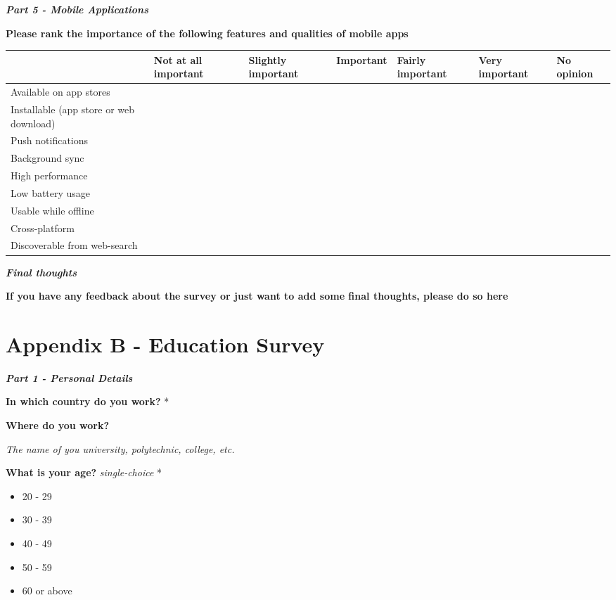 \documentclass[a4paper,12pt]{article}
\begin{document}
\textbf{\textit{Part 5 - Mobile Applications}}

\textbf{Please rank the importance of the following features and qualities of mobile apps}
\begin{tabular}{|p{3cm}|p{1.7cm}|p{1.7cm}|p{1.6cm}|p{1.7cm}|p{1.6cm}|p{1.4cm}|}
  \hline
     & Not at all important  & Slightly important  &  Important & Fairly important  & Very important  & No opinion \\
  \hline
  Available on app stores   &   &   &   &   &   &  \\
  \hline
  Installable (app store or web download)   &   &   &   &   &   & \\
  \hline
   Push notifications  &   &   &   &   &   & \\
  \hline
   Background sync   &   &   &   &   &   & \\
  \hline
   High performance  &   &   &   &   &   & \\
  \hline
   Low battery usage  &   &   &   &   &   & \\
  \hline
   Usable while offline &   &   &   &   &   & \\
  \hline
   Cross-platform  &   &   &   &   &   & \\
  \hline
   Discoverable from web-search  &   &   &   &   &   & \\
  \hline
\end{tabular}

\quad

\textbf{\textit{Final thoughts}}

\textbf{If you have any feedback about the survey or just want to add some final thoughts, please do so here}

\newpage
\section{Appendix B - Education Survey} 
\label{Appendix_eduSurvey}

\textbf{\textit{Part 1 - Personal Details}}

\textbf{In which country do you work?} *

\quad

\textbf{Where do you work?}

\textit{The name of you university, polytechnic, college, etc.}

\quad

\textbf{What is your age?}  \textit{single-choice} *
\begin{itemize}
    \item 20 - 29
    \item 30 - 39
    \item 40 - 49
    \item 50 - 59
    \item 60 or above
\end{itemize}
\end{document}
